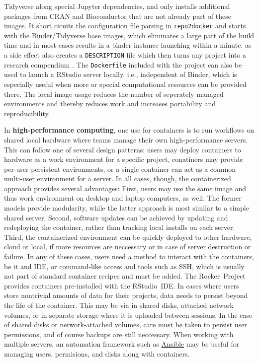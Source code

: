 Tidyverse along special Jupyter dependencies, and only installs
additional packages from CRAN and Bioconductor that are not already part
of these images. It short cicuits the configuration file parsing in
\texttt{repo2docker} and starts with the Binder/Tidyverse base images,
which eliminates a large part of the build time and in most cases
results in a binder instance launching within a minute. 
as a side effect also creates a \texttt{DESCRIPTION} file which then
turns any project into a research compendium
\citep{marwick_packaging_2018}. The \texttt{Dockerfile} included with
the project can also be used to launch a RStudio server locally, i.e.,
independent of Binder, which is especially useful when more or special
computational resources can be provided there. The local image usage
reduces the number of seperately managed environments and thereby
reduces work and increases portability and reproducibility.

In \textbf{high-performance computing}, one use for containers is to run
workflows on shared local hardware where teams manage their own
high-performance servers. This can follow one of several design
patterns: users may deploy containers to hardware as a work environment
for a specific project, conatiners may provide per-user persistent
environments, or a single container can act as a common multi-user
environment for a server. In all cases, though, the containerized
approach provides several advantages: First, users may use the same
image and thus work environment on desktop and laptop computers, as
well. The former models provide modularity, while the latter approach is
most similar to a simple shared server. Second, software updates can be
achieved by updating and redeploying the container, rather than tracking
local installs on each server. Third, the containerized environment can
be quickly deployed to other hardware, cloud or local, if more resources
are neccessary or in case of server destruction or failure. In any of
these cases, users need a method to interact with the containers, be it
and IDE, or command-like access and tools such as SSH, which is usually
not part of standard container recipes and must be added. The
Rocker~Project provides containers pre-installed with the RStudio~IDE.
In cases where users store nontrivial amounts of data for their
projects, data needs to persist beyond the life of the container. This
may be via in shared disks, attached network volumes, or in separate
storage where it is uploaded between sessions. In the case of shared
disks or network-attached volumes, care must be taken to persist user
permissions, and of course backups are still neccessary. When working
with multiple servers, an automation framework such as
\href{https://www.ansible.com}{Ansible} may be useful for managing
users, permisions, and disks along with containers.

